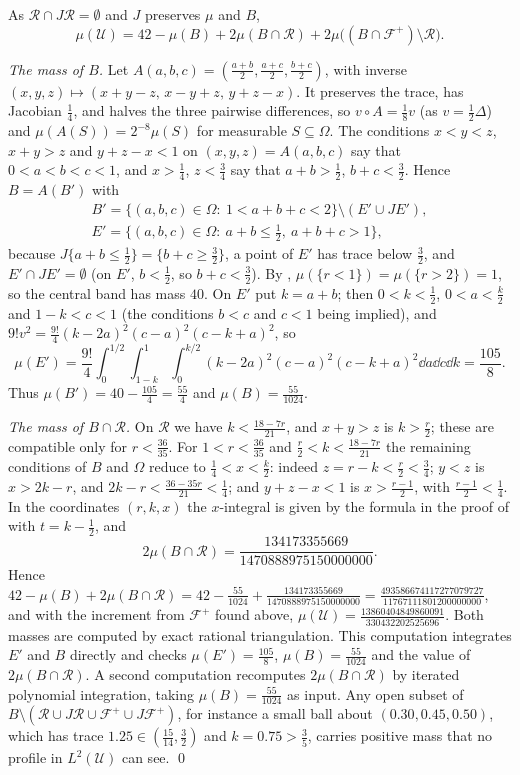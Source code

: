 \documentclass[11pt,colorlinks]{charlie}
\newcommand{\Om}{\Omega}
\begin{document}
As $\mathcal R\cap J\mathcal R=\emptyset$ and $J$ preserves $\mu$ and $B$,
\[
 \mu(\mathcal U)=42-\mu(B)+2\mu(B\cap\mathcal R)+2\mu\big((B\cap\mathcal F^+)\setminus\mathcal R\big).
\]

\emph{The mass of $B$.} Let $A(a,b,c)=(\frac{a+b}2,\frac{a+c}2,\frac{b+c}2)$, with inverse $(x,y,z)\mapsto(x+y-z,\,x-y+z,\,y+z-x)$. It preserves the trace, has Jacobian $\frac14$, and halves the three pairwise differences, so $v\circ A=\frac18v$ (as $v=\frac12\Delta$) and $\mu(A(S))=2^{-8}\mu(S)$ for measurable $S\subseteq\Om$. The conditions $x<y<z$, $x+y>z$ and $y+z-x<1$ on $(x,y,z)=A(a,b,c)$ say that $0<a<b<c<1$, and $x>\frac14$, $z<\frac34$ say that $a+b>\frac12$, $b+c<\frac32$. Hence $B=A(B')$ with
\[
 \begin{gathered}
 B'=\{(a,b,c)\in\Om:\ 1<a+b+c<2\}\setminus(E'\cup JE'),\\
 E'=\{(a,b,c)\in\Om:\ a+b\le\tfrac12,\ a+b+c>1\},
 \end{gathered}
\]
because $J\{a+b\le\frac12\}=\{b+c\ge\frac32\}$, a point of $E'$ has trace below $\frac32$, and $E'\cap JE'=\emptyset$ (on $E'$, $b<\frac12$, so $b+c<\frac32$). By , $\mu(\{r<1\})=\mu(\{r>2\})=1$, so the central band has mass $40$. On $E'$ put $k=a+b$; then $0<k<\frac12$, $0<a<\frac k2$ and $1-k<c<1$ (the conditions $b<c$ and $c<1$ being implied), and $9!v^2=\frac{9!}4(k-2a)^2(c-a)^2(c-k+a)^2$, so
\[
 \mu(E')=\frac{9!}{4}\int_0^{1/2}\int_{1-k}^1\int_0^{k/2}(k-2a)^2(c-a)^2(c-k+a)^2\dd a\dd c\dd k=\frac{105}{8}.
\]
Thus $\mu(B')=40-\frac{105}4=\frac{55}4$ and $\mu(B)=\frac{55}{1024}$.

\emph{The mass of $B\cap\mathcal R$.} On $\mathcal R$ we have $k<\frac{18-7r}{21}$, and $x+y>z$ is $k>\frac r2$; these are compatible only for $r<\frac{36}{35}$. For $1<r<\frac{36}{35}$ and $\frac r2<k<\frac{18-7r}{21}$ the remaining conditions of $B$ and $\Om$ reduce to $\frac14<x<\frac k2$: indeed $z=r-k<\frac r2<\frac34$; $y<z$ is $x>2k-r$, and $2k-r<\frac{36-35r}{21}<\frac14$; and $y+z-x<1$ is $x>\frac{r-1}2$, with $\frac{r-1}2<\frac14$. In the coordinates $(r,k,x)$ the $x$-integral is given by the formula in the proof of  with $t=k-\frac12$, and
\[
 2\mu(B\cap\mathcal R)=\frac{134173355669}{1470888975150000000}.
\]
Hence $42-\mu(B)+2\mu(B\cap\mathcal R)=42-\frac{55}{1024}+\frac{134173355669}{1470888975150000000}=\frac{493586674117277079727}{11767111801200000000}$, and with the increment from $\mathcal F^+$ found above, $\mu(\mathcal U)=\frac{13860404849860091}{330432202525696}$. Both masses are computed by exact rational triangulation. This computation integrates $E'$ and $B$ directly and checks $\mu(E')=\frac{105}8$, $\mu(B)=\frac{55}{1024}$ and the value of $2\mu(B\cap\mathcal R)$. A second computation recomputes $2\mu(B\cap\mathcal R)$ by iterated polynomial integration, taking $\mu(B)=\frac{55}{1024}$ as input. Any open subset of $B\setminus(\mathcal R\cup J\mathcal R\cup\mathcal F^+\cup J\mathcal F^+)$, for instance a small ball about $(0.30,0.45,0.50)$, which has trace $1.25\in(\frac{15}{14},\frac32)$ and $k=0.75>\frac35$, carries positive mass that no profile in $L^2(\mathcal U)$ can see. \qed
\end{document}
